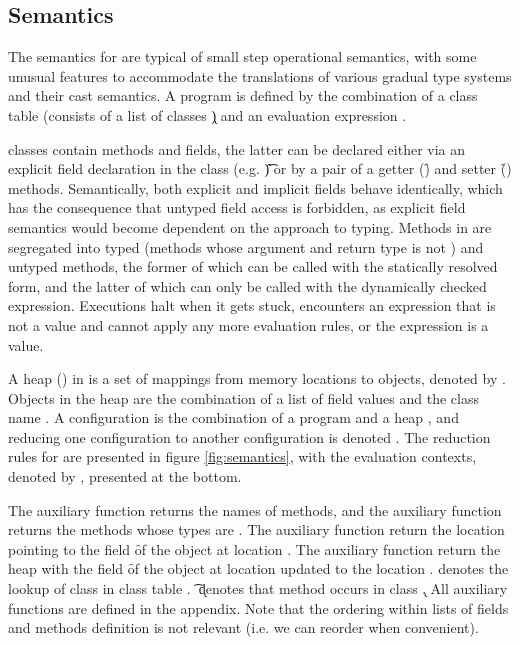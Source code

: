\documentclass[a4paper,USenglish]{tex/lipics-v2016}
\begin{document}
\subsection{Semantics}

The semantics for \kafka are typical of small step operational semantics,  with
some unusual features to accommodate the translations of various gradual type
systems and their cast semantics. A \kafka program is defined  by the
combination of a class table \K (consists of a list of classes \k) and an
evaluation expression \e. 

\kafka classes contain methods and fields, the latter can be declared  either
via an explicit field declaration in the class (e.g. \HT\f\t) or by a pair of a
getter (\Get\this\f) and setter  (\Set\this\f\x) methods. Semantically, both
explicit and implicit fields behave  identically, which has the consequence that
untyped field access is forbidden,  as explicit field semantics would become
dependent on the approach to typing.  Methods in \kafka are segregated into
typed (methods whose argument and return type is not \any) and untyped methods,
the former of which can be  called with the statically resolved \Call\e\m\e
form, and the latter of which can only be called with the dynamically checked
\DynCall\e\m\e  expression. Executions halt when it gets stuck, encounters an
expression that is  not a value and cannot apply any more evaluation rules, or
the expression is a value.

A heap (\s) in \kafka is a set of mappings from memory locations to objects,
denoted by \Map\s{\Bind\a{\obj\C{\b\a}}}. Objects in the heap are the
combination of a list of field values \a and the class name \C. A configuration
is the combination of a program \K\e and a heap \s,  and reducing one
configuration \K\e\s to another configuration \Kp\ep\sp  is denoted
\Reduce\K\e\s\Kp\ep\sp. The reduction rules for \kafka are presented  in figure
\ref{fig:semantics}, with the evaluation contexts, denoted by \EE, presented  at
the bottom.

The auxiliary function  returns the names of methods, and the auxiliary
function \untyped{} returns the methods whose types are \any. The auxiliary
function  return the location \ap pointing to the field \f of the
object at location \a. The auxiliary function  return the heap \sp
with the field \f of the object at location \a updated to the location \ap.
\App\K\C denotes the lookup of class \C in class table \K. \Mdef\m\x\t\tp\e \In
\k denotes that method \m occurs in class \k. All auxiliary  functions are
defined in the appendix. Note that the ordering within lists of  fields and
methods definition is not relevant (i.e. we can reorder when convenient).
\end{document}
